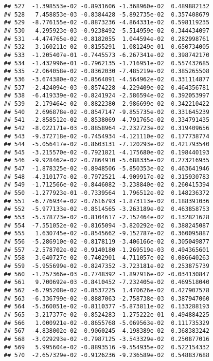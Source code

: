 \documentclass[
]{article}
\begin{document}
\begin{verbatim}
## 527  -1.398553e-02 -0.8931606 -1.368960e-02  0.489882132
## 528   7.458853e-03 -0.8384428 -5.892735e-02  0.357408679
## 529  -8.776155e-02 -0.8873236 -4.864331e-02  0.598119235
## 530   4.295923e-03 -0.9238492 -5.514959e-02  0.344434097
## 531  -4.474765e-02 -0.8182055  1.044594e-02  0.282998761
## 532  -3.160211e-02 -0.8155291 -1.081249e-01  0.650734005
## 533  -1.205407e-01 -0.7445573 -6.267341e-02  0.398742170
## 534  -1.432996e-01 -0.7962135 -1.716951e-02  0.557432685
## 535  -2.064058e-02 -0.8362030 -7.485219e-02  0.385265508
## 536  -3.674380e-02 -0.8564091 -4.564962e-02  0.331114877
## 537  -2.424094e-03 -0.8574228 -4.229409e-02  0.464356781
## 538  -6.419339e-02 -0.8241924 -2.586594e-02  0.392053997
## 539  -2.179464e-02 -0.8822380 -2.986699e-02  0.342210422
## 540   2.696878e-02 -0.8547147 -9.855735e-02  0.331645239
## 541  -2.858512e-02 -0.8538069 -4.791765e-02  0.334791435
## 542  -8.022171e-03 -0.8858964 -2.232723e-02  0.319409656
## 543  -9.372718e-02 -0.7454934 -4.121110e-02  0.177738774
## 544  -5.056417e-02 -0.8603131 -7.120293e-02  0.421793540
## 545  -3.215570e-02 -0.7921821 -4.175680e-02  0.198440193
## 546  -9.928462e-02 -0.7864910 -5.688335e-02  0.273216935
## 547  -1.878325e-02 -0.8948506 -5.850353e-02  0.463641946
## 548  -4.310177e-02 -0.7972521 -4.909917e-02  0.315930783
## 549  -1.712566e-02 -0.8446082 -3.238840e-02  0.260415394
## 550  -1.277923e-01 -0.7339564  1.796512e-02  0.148236372
## 551  -6.776934e-02 -0.7616793 -1.873113e-02  0.188391036
## 552  -5.977133e-02 -0.8514565 -3.263189e-02  0.463858753
## 553  -5.578773e-02 -0.8104617 -2.152464e-02  0.132821628
## 554  -7.551052e-02 -0.8165094 -3.820292e-02  0.388245087
## 555   1.630745e-02 -0.8545662 -9.152787e-02  0.360095887
## 556  -5.286910e-02 -0.8178119 -3.406166e-02  0.305049877
## 557  -2.578702e-02 -0.9140180 -1.269519e-03  0.494365601
## 558  -3.640727e-02 -0.7402901 -4.711057e-02  0.086640263
## 559  -5.955699e-02 -0.8247352 -3.723181e-02  0.253875739
## 560  -1.257366e-03 -0.7748392 -1.897916e-02 -0.034130847
## 561   9.700692e-03 -0.8410452 -7.232405e-02  0.469518040
## 562  -6.795208e-02 -0.8537225  1.470626e-02  0.427907578
## 563  -6.336799e-02 -0.8887063 -2.758738e-03  0.387947060
## 564  -5.360051e-02 -0.8110377 -5.873811e-02  0.133288193
## 565  -3.217377e-02 -0.8524283 -1.275222e-01  0.494884225
## 566   1.000921e-02 -0.8655768 -5.069563e-02  0.111735329
## 567  -4.838002e-02 -0.9060245 -4.198389e-02  0.368383242
## 568  -3.029293e-02 -0.7987125 -3.543329e-02  0.250877016
## 569   5.995604e-02 -0.8893516 -9.554935e-02  0.522154332
## 570  -2.657329e-02 -0.9126236 -9.236589e-02  0.548837688

\end{verbatim}
\end{document}
